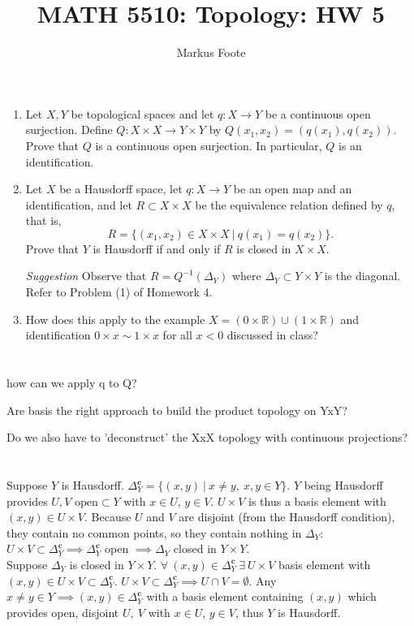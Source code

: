 \documentclass{jhwhw}
\title{MATH 5510: Topology: HW 5}
\author{Markus Foote}
\newcommand{\R}{{\mathbb R}}
\begin{document}
\problem{}%
\begin{enumerate}
	
	\item Let $X,Y$ be topological spaces and let $q:X\to Y$ be a continuous open surjection. Define 
	$Q:X\times X \to Y\times Y$ by  $Q(x_1,x_2) = (q(x_1),q(x_2)).$  
	Prove that $Q$ is a continuous open surjection.  In particular, $Q$ is an identification.
	\item Let $X$ be a Hausdorff space, let $q:X\to Y$ be an open map and an identification, and let $R\subset X\times X$ be the equivalence relation defined by $q$, that is,
	$$
	R = \{ (x_1,x_2)\in X\times X \ | \ q(x_1) = q(x_2) \}.
	$$
	Prove that $Y$ is Hausdorff if and only if $R$  is closed in $X\times X$. 
	
	\noindent\emph{Suggestion} Observe that  $R = Q^{-1}(\Delta_Y)$ where $\Delta_Y\subset Y\times Y$ is the diagonal.  Refer to Problem (1) of Homework 4.
	
	\item How does this apply to the example $X =( 0\times\R )\cup (1\times \R)$ and identification $0\times x \sim 1\times x$ for all $x<0$ discussed in class?
\end{enumerate}
\solution{}
\part{}%
how can we apply q to Q?

Are basis the right approach to build the product topology on YxY? 

Do we also have to 'deconstruct' the XxX topology with continuous projections?

\part{}%
Suppose $Y$ is Hausdorff. $\Delta_Y^{\mathbf{c}}=\{(x,y)\ | \ x\ne y,\ x,y\in Y\}$. $Y$ being Hausdorff provides $U,V\text{ open}\subset Y$ with $x\in U$, $y\in V$. $U\times V$ is thus a basis element with $(x,y) \in U\times V$. Because $U$ and $V$ are disjoint (from the Hausdorff condition), they contain no common points, so they contain nothing in $\Delta_Y$: $U\times V \subset \Delta_Y^{\mathbf{c}}\implies \Delta_Y^{\mathbf{c}}$ open $\implies \Delta_Y$ closed in $Y\times Y$.
\\

\noindent
Suppose $\Delta_Y$ is closed in $Y\times Y$. $\forall\ (x,y)\in \Delta_Y^{\mathbf{c}}\  \exists\ U\times V$ basis element with $(x,y)\in U\times V \subset \Delta_Y^{\mathbf{c}}$. $U\times V \subset \Delta_Y^{\mathbf{c}} \implies U\cap V=\emptyset$. Any $x\ne y\in Y \implies (x,y)\in \Delta_Y^{\mathbf{c}}$ with a basis element containing $(x,y)$ which provides open, disjoint $U,\ V$ with $x\in U$, $y\in V$, thus $Y$ is Hausdorff.
\end{document}
